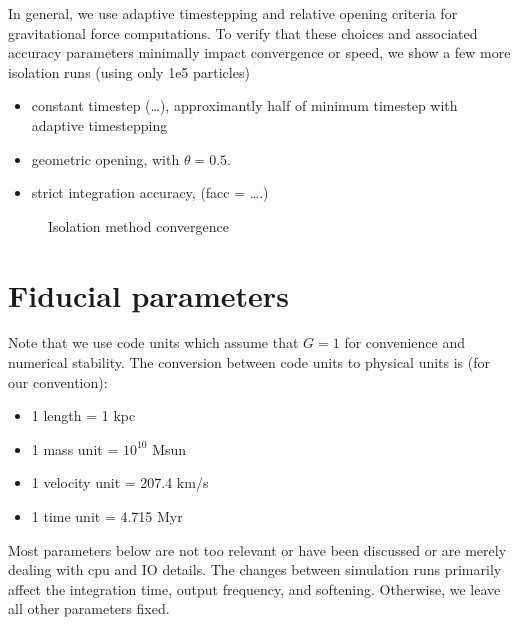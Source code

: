 In general, we use adaptive timestepping and relative opening criteria
for gravitational force computations. To verify that these choices and
associated accuracy parameters minimally impact convergence or speed, we
show a few more isolation runs (using only 1e5 particles)

\begin{itemize}
\tightlist
\item
  constant timestep (\ldots), approximantly half of minimum timestep
  with adaptive timestepping
\item
  geometric opening, with \(\theta = 0.5\).
\item
  strict integration accuracy, (facc = \ldots.)
\end{itemize}

\begin{figure}
\centering
{}
\caption{Isolation method convergence}\label{fig:methods_convergence}
\end{figure}

\section{Fiducial parameters}\label{fiducial-parameters}

Note that we use code units which assume that \(G=1\) for convenience
and numerical stability. The conversion between code units to physical
units is (for our convention):

\begin{itemize}
\tightlist
\item
  1 length = 1 kpc
\item
  1 mass unit = \(10^{10}\) Msun
\item
  1 velocity unit = 207.4 km/s
\item
  1 time unit = 4.715 Myr
\end{itemize}

Most parameters below are not too relevant or have been discussed or are
merely dealing with cpu and IO details. The changes between simulation
runs primarily affect the integration time, output frequency, and
softening. Otherwise, we leave all other parameters fixed.

